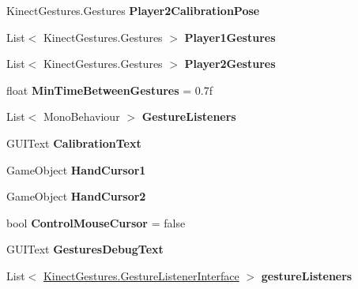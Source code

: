 \begin{DoxyCompactItemize}
\mbox{\label{class_kinect_manager_ac59fc32fdd612d789d5ce25e6ea246dc}} 
Kinect\+Gestures.\+Gestures {\bfseries Player2\+Calibration\+Pose}
\item 
\mbox{\label{class_kinect_manager_aa6776a77e3dc3c598ce7988e123bc435}} 
List$<$ Kinect\+Gestures.\+Gestures $>$ {\bfseries Player1\+Gestures}
\item 
\mbox{\label{class_kinect_manager_ae57ce2eaaa9461b5e07486a4e1b67c6a}} 
List$<$ Kinect\+Gestures.\+Gestures $>$ {\bfseries Player2\+Gestures}
\item 
\mbox{\label{class_kinect_manager_a903eee63e4808c7389ccbae4aa440eb5}} 
float {\bfseries Min\+Time\+Between\+Gestures} = 0.\+7f
\item 
\mbox{\label{class_kinect_manager_a2b4fc705e42ca9612d307fbf0ebb1b83}} 
List$<$ Mono\+Behaviour $>$ {\bfseries Gesture\+Listeners}
\item 
\mbox{\label{class_kinect_manager_a7d0d4d7538c0c428b408c8f475058876}} 
G\+U\+I\+Text {\bfseries Calibration\+Text}
\item 
\mbox{\label{class_kinect_manager_a7be62988c680b23ea117075ec00328dd}} 
Game\+Object {\bfseries Hand\+Cursor1}
\item 
\mbox{\label{class_kinect_manager_ad8ca02e3a607dba673506ed151d25f0c}} 
Game\+Object {\bfseries Hand\+Cursor2}
\item 
\mbox{\label{class_kinect_manager_a17ab5b97a7d8473c24fc0ef93d87fbff}} 
bool {\bfseries Control\+Mouse\+Cursor} = false
\item 
\mbox{\label{class_kinect_manager_ae2c34913121504744086fb882a9a8038}} 
G\+U\+I\+Text {\bfseries Gestures\+Debug\+Text}
\item 
\mbox{\label{class_kinect_manager_a3ecfea0fbd8d8a705fe429bcbd5ee24a}} 
List$<$ \mbox{\hyperlink{interface_kinect_gestures_1_1_gesture_listener_interface}{Kinect\+Gestures.\+Gesture\+Listener\+Interface}} $>$ {\bfseries gesture\+Listeners}
\end{DoxyCompactItemize}
